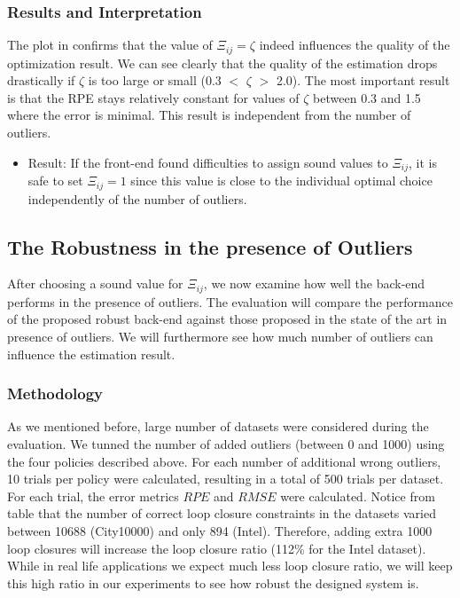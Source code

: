 \documentclass[9pt,technote]{IEEEtran}
\begin{document}
\subsubsection{Results and Interpretation}
The plot in confirms that the value of $\Xi_{ij} = \zeta$ indeed influences the quality of the optimization result. We can see clearly that the quality of the estimation drops drastically if $\zeta$ is too large or small (0.3 $<$ $\zeta$ $>$ 2.0). The most important result is that the RPE stays relatively constant for values of $\zeta$ between 0.3 and 1.5 where the error is minimal. This result is independent from the number of outliers. 
\begin{itemize}
\item Result: If the front-end found difficulties to assign sound values to $\Xi_{ij}$, it is safe to set $\Xi_{ij} = 1$ since this value is close to the individual optimal choice independently of the number of outliers. 
\end{itemize}

\subsection{The Robustness in the presence of Outliers}
After choosing a sound value for $\Xi_{ij}$, we now examine how well the back-end performs in the presence of outliers.
The evaluation will compare the performance of the proposed robust back-end against those proposed in the state of the art in presence of outliers. We will furthermore see how much number of outliers can influence the estimation result. \\ 
\subsubsection{Methodology}
As we mentioned before, large number of datasets were considered during the evaluation. We tunned the number of added outliers (between 0 and 1000) using the four policies described above. For each  number of additional wrong outliers, 10 trials per policy were calculated, resulting in a total of 500 trials per dataset. For each trial, the error metrics $RPE$ and $RMSE$ were calculated. Notice from table that the number of correct loop closure constraints in the datasets varied between 10688 (City10000) and only 894 (Intel).
Therefore, adding extra 1000 loop closures will increase the loop closure ratio (112\% for the Intel dataset). While in real life applications we expect much less loop closure ratio, we will keep this high ratio in our experiments to see how robust the designed system is.\\ 
\end{document}
